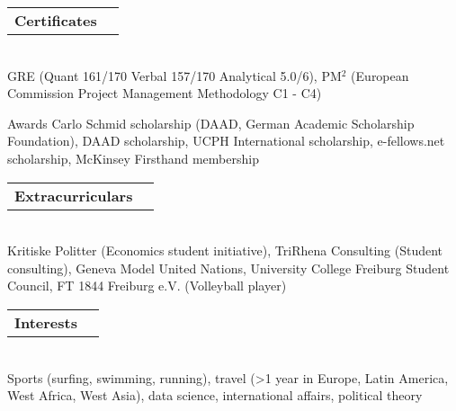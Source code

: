 \documentclass[A4,11pt]{article}
\makeatletter
\newcommand{\Subheading}[5]{   
    \begin{tabular*}{0.97\textwidth}[t]{l@{\extracolsep{\fill}}r}
      \textbf{#1}\textit{\small #2} & \small #3 
      \end{tabular*} \\
      \small #4 \\
    \vspace{7pt}
    }
\makeatother
\begin{document}
    \Subheading
    {Certificates}{}{}
    {GRE (Quant 161/170 Verbal 157/170 Analytical 5.0/6),  
    PM$^2$ (European Commission Project Management Methodology C1 - C4)}
    
    \Subheading
    {Awards}{}{}
    {Carlo Schmid scholarship (DAAD, German Academic Scholarship Foundation), 
    DAAD scholarship, 
    UCPH International scholarship, 
    e-fellows.net scholarship, 
    McKinsey Firsthand membership} 

    \Subheading
    {Extracurriculars}{}{}
    {Kritiske Politter (Economics student initiative), TriRhena Consulting (Student consulting), Geneva Model United Nations, University College Freiburg Student Council, FT 1844 Freiburg e.V. (Volleyball player)}{}

    \Subheading
    {Interests}{}{}
    {Sports (surfing, swimming, running), travel (>1 year in Europe, Latin America, West Africa, West Asia), data science, international affairs, political theory}

\vfill
{}
\end{document}
